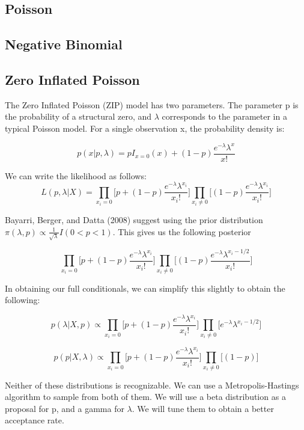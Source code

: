 \documentclass{article}
\begin{document}
\subsection{Poisson}
\label{ss:mPoisson}

\subsection{Negative Binomial}
\label{ss:mNBinom}


\subsection{Zero Inflated Poisson}
\label{ss:mZiPoisson}
The Zero Inflated Poisson (ZIP) model has two parameters. The parameter p is the probability of a structural zero, and $\lambda$ corresponds to the parameter in a typical Poisson model. For a single observation x, the probability density is:

\[
p(x|p, \lambda) = pI_{x=0}(x) + (1-p)\frac{e^{-\lambda}\lambda^x}{x!}
\]


\noindent We can write the likelihood as follows:
$$
L(p, \lambda|X) = \prod_{x_i=0}\bigg[p+(1-p)\frac{e^{-\lambda}\lambda^{x_i}}{x_i!}\bigg]\prod_{x_i \ne 0}\bigg[(1-p)\frac{e^{-\lambda}\lambda^{x_i}}{x_i!}\bigg]
$$

\noindent Bayarri, Berger, and Datta (2008) suggest using the prior distribution $\pi(\lambda, p) \propto \frac{1}{\sqrt{\lambda}}I(0<p<1)$. This gives us the following posterior 

\[
\prod_{x_i=0}\bigg[p+(1-p)\frac{e^{-\lambda}\lambda^{x_i}}{x_i!}\bigg]\prod_{x_i \ne 0}\bigg[(1-p)\frac{e^{-\lambda}\lambda^{x_i - 1/2}}{x_i!}\bigg]
\]

\noindent In obtaining our full conditionals, we can simplify this slightly to obtain the following:

\[
p(\lambda|X, p) \propto \prod_{x_i=0}\bigg[p+(1-p)\frac{e^{-\lambda}\lambda^{x_i}}{x_i!}\bigg]\prod_{x_i \ne 0}\bigg[e^{-\lambda}\lambda^{x_i - 1/2}\bigg]
\]

\[
p(p|X, \lambda) \propto \prod_{x_i=0}\bigg[p+(1-p)\frac{e^{-\lambda}\lambda^{x_i}}{x_i!}\bigg]\prod_{x_i \ne 0}\bigg[(1-p)\bigg]
\]

\noindent Neither of these distributions is recognizable. We can use a Metropolis-Hastings algorithm to sample from both of them. We will use a beta distribution as a proposal for p, and a gamma for $\lambda$. We will tune them to obtain a better acceptance rate. 
\end{document}
